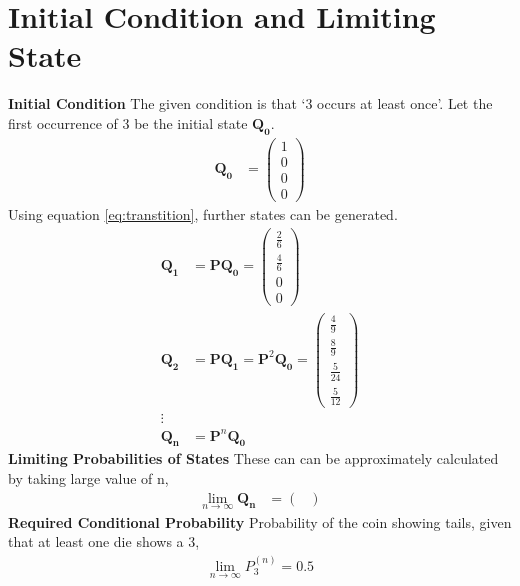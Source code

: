 \documentclass[journal,12pt,two column]{IEEEtran}
\providecommand{\prt}[2]{\ensuremath{P_{#1}^{\left(#2\right)} }}        %
\theoremstyle{remark}
\newcommand{\myvec}[1]{\ensuremath{\begin{pmatrix}#1\end{pmatrix}}}
\let\vec\mathbf
\begin{document}
\section{Initial Condition and Limiting State}
\textbf{Initial Condition}
     The given condition is that \lq3 occurs at least once\rq. Let the first occurrence of 3 be the initial state $ \vec{Q_0}$.
    \begin{align}
        \vec{Q_0} &= \myvec{ 1 \\ 0 \\ 0 \\ 0 } 
    \end{align}
    Using equation \eqref{eq:transtition}, further states can be generated.
    \begin{align}
        \vec{Q_1} &= \vec{P} \vec{Q_{0}}
            = \myvec{\frac{2}{6} \\[4pt] \frac{4}{6}  \\[4pt] 0 \\ 0}\\
        \vec{Q_2} &= \vec{P} \vec{Q_1} = \vec{P}^{2} \vec{Q_0} 
            = \myvec{\frac{4}{9}  \\[4pt] \frac{8}{9}  \\[4pt] \frac{5}{24}\\[4pt] \frac{5}{12}} \\   
        \vdots \\
        \vec{Q_n} &= \vec{P}^{n} \vec{Q_0}
    \end{align}
\textbf{Limiting Probabilities of States}
    These can can be approximately calculated by taking large value of n,
    \begin{align}
       \lim_{n \to \infty}  \vec{Q_n} &= 
       \myvec{} 
    \end{align}
\textbf{Required Conditional Probability}
    Probability of the coin showing tails, given that at least one die shows a 3,
    \begin{align}
       \lim_{n \to \infty} \prt{3}{n} = 0.5
    \end{align}
    
\end{document}
